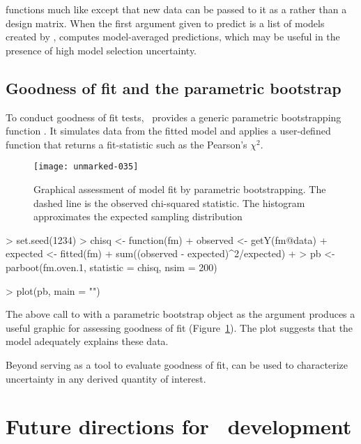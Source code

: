 \documentclass[article,shortnames]{jss}
\newcommand{\um}{\pkg{unmarked}}
\begin{document}
{ functions much like  except that new data can be
passed to it as a  rather than a design matrix. When the first
argument given to predict is a list of models created by ,
 computes model-averaged predictions, which may be
useful in the presence of high model selection uncertainty.



\subsection{Goodness of fit and the parametric bootstrap}

To conduct goodness of fit tests, \um\ provides a generic parametric
bootstrapping function .  It simulates data from the fitted model and
applies a user-defined function that returns a fit-statistic such as the
Pearson's $\chi^2$.



\begin{figure}[th!]
  \centering
\texttt{[image: unmarked-035]}
\caption{Graphical assessment of model fit by parametric bootstrapping.  The dashed
line is the observed chi-squared statistic. The histogram approximates the
expected sampling distribution}
\label{fig:pb}
\end{figure}

\begin{Schunk}
\begin{Sinput}
> set.seed(1234)
> chisq <- function(fm) {
+     observed <- getY(fm@data)
+     expected <- fitted(fm)
+     sum((observed - expected)^2/expected)
+ }
> pb <- parboot(fm.oven.1, statistic = chisq, nsim = 200)
\end{Sinput}
\end{Schunk}
\begin{Schunk}
\begin{Sinput}
> plot(pb, main = "")
\end{Sinput}
\end{Schunk}


The above call to  with a parametric bootstrap object as
the argument produces a useful graphic for assessing goodness of fit
(Figure~\ref{fig:pb}).  The plot suggests that the model adequately
explains these data.

Beyond serving as a tool to evaluate goodness of fit,
 can be used to characterize uncertainty in any derived quantity
of interest.


\section[Future directions for unmarked development]{Future directions for \um\ development}
\label{sec:future-direct-unmark}

}
\end{document}
